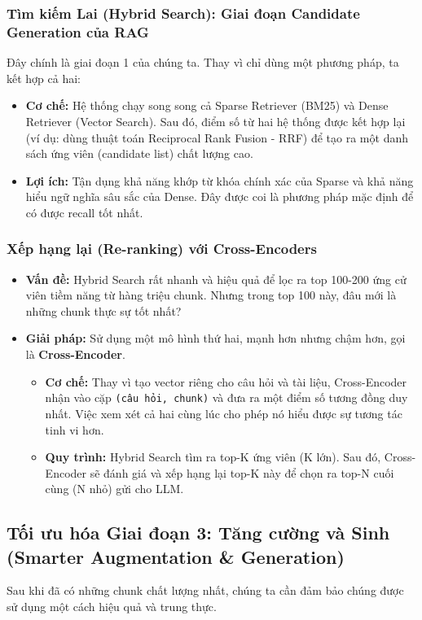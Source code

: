 \subsubsection{Tìm kiếm Lai (Hybrid Search): Giai đoạn Candidate Generation của RAG}
Đây chính là giai đoạn 1 của chúng ta. Thay vì chỉ dùng một phương pháp, ta kết hợp cả hai:
\begin{itemize}
    \item \textbf{Cơ chế:} Hệ thống chạy song song cả Sparse Retriever (BM25) và Dense Retriever (Vector Search). Sau đó, điểm số từ hai hệ thống được kết hợp lại (ví dụ: dùng thuật toán Reciprocal Rank Fusion - RRF) để tạo ra một danh sách ứng viên (candidate list) chất lượng cao.
    \item \textbf{Lợi ích:} Tận dụng khả năng khớp từ khóa chính xác của Sparse và khả năng hiểu ngữ nghĩa sâu sắc của Dense. Đây được coi là phương pháp mặc định để có được recall tốt nhất.
\end{itemize}

\subsubsection{Xếp hạng lại (Re-ranking) với Cross-Encoders}
\begin{itemize}
    \item \textbf{Vấn đề:} Hybrid Search rất nhanh và hiệu quả để lọc ra top 100-200 ứng cử viên tiềm năng từ hàng triệu chunk. Nhưng trong top 100 này, đâu mới là những chunk thực sự tốt nhất?
    \item \textbf{Giải pháp:} Sử dụng một mô hình thứ hai, mạnh hơn nhưng chậm hơn, gọi là \textbf{Cross-Encoder}.
        \begin{itemize}
            \item \textbf{Cơ chế:} Thay vì tạo vector riêng cho câu hỏi và tài liệu, Cross-Encoder nhận vào cặp \texttt{(câu hỏi, chunk)} và đưa ra một điểm số tương đồng duy nhất. Việc xem xét cả hai cùng lúc cho phép nó hiểu được sự tương tác tinh vi hơn.
            \item \textbf{Quy trình:} Hybrid Search tìm ra top-K ứng viên (K lớn). Sau đó, Cross-Encoder sẽ đánh giá và xếp hạng lại top-K này để chọn ra top-N cuối cùng (N nhỏ) gửi cho LLM.
        \end{itemize}
\end{itemize}

\subsection{Tối ưu hóa Giai đoạn 3: Tăng cường và Sinh (Smarter Augmentation \& Generation)}
\label{ssec:smarter_aug_gen}
Sau khi đã có những chunk chất lượng nhất, chúng ta cần đảm bảo chúng được sử dụng một cách hiệu quả và trung thực.

